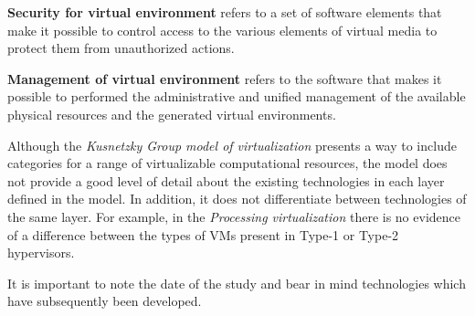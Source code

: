 	\textbf{Security for virtual environment} refers to a set of software elements that make it possible to control access to the various elements of virtual media to protect them from unauthorized actions.
		
	\textbf{Management of virtual environment} refers to the software that makes it possible to performed the administrative and unified management of the available physical resources and the generated virtual environments.

	Although the \textit{Kusnetzky Group model of virtualization} presents a way to include categories for a range of virtualizable computational resources, the model does not provide a good level of detail about the existing technologies in each layer defined in the model. In addition, it does not differentiate between technologies of the same layer. For example, in the \textit{Processing virtualization} there is no evidence of a difference between the types of VMs present in Type-1 or Type-2 hypervisors. 
	
	It is important to note the date of the study and bear in mind technologies which have subsequently been developed. 
